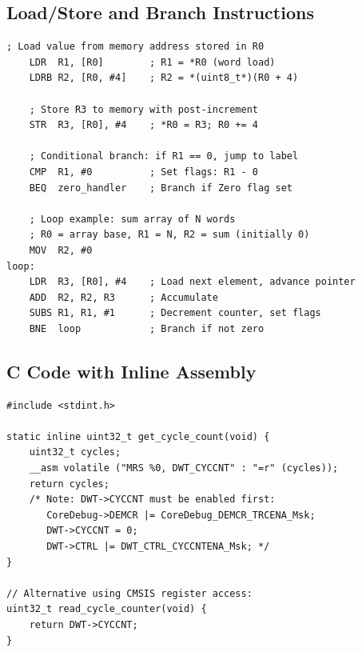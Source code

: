 \subsection{Load/Store and Branch Instructions}

\begin{lstlisting}[style=ARM, caption={ARM Cortex-M assembly: memory access and branching.}]
    ; Load value from memory address stored in R0
    LDR  R1, [R0]        ; R1 = *R0 (word load)
    LDRB R2, [R0, #4]    ; R2 = *(uint8_t*)(R0 + 4)
    
    ; Store R3 to memory with post-increment
    STR  R3, [R0], #4    ; *R0 = R3; R0 += 4
    
    ; Conditional branch: if R1 == 0, jump to label
    CMP  R1, #0          ; Set flags: R1 - 0
    BEQ  zero_handler    ; Branch if Zero flag set
    
    ; Loop example: sum array of N words
    ; R0 = array base, R1 = N, R2 = sum (initially 0)
    MOV  R2, #0
loop:
    LDR  R3, [R0], #4    ; Load next element, advance pointer
    ADD  R2, R2, R3      ; Accumulate
    SUBS R1, R1, #1      ; Decrement counter, set flags
    BNE  loop            ; Branch if not zero
\end{lstlisting}

\subsection{C Code with Inline Assembly}

\begin{lstlisting}[style=C, caption={C function using inline assembly to read the cycle counter (DWT) on Cortex-M.}]
#include <stdint.h>

static inline uint32_t get_cycle_count(void) {
    uint32_t cycles;
    __asm volatile ("MRS %0, DWT_CYCCNT" : "=r" (cycles));
    return cycles;
    /* Note: DWT->CYCCNT must be enabled first:
       CoreDebug->DEMCR |= CoreDebug_DEMCR_TRCENA_Msk;
       DWT->CYCCNT = 0;
       DWT->CTRL |= DWT_CTRL_CYCCNTENA_Msk; */
}

// Alternative using CMSIS register access:
uint32_t read_cycle_counter(void) {
    return DWT->CYCCNT;
}
\end{lstlisting}

